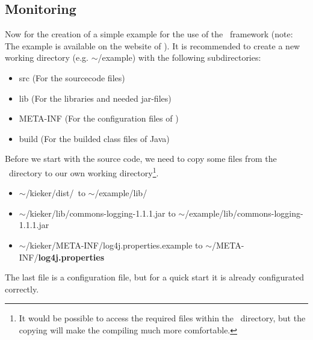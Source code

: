 \documentclass[a4paper, oneside, 11pt]{scrartcl}
\begin{document}
    \subsection{Monitoring}
      Now for the creation of a simple example for the use of the \Kieker\ framework (note: The example is available on the website of \Kieker). It is recommended to create a new working directory (e.g. $\sim$/example) with the following subdirectories:
      \begin{itemize}
	\item src (For the sourcecode files)
	\item lib (For the libraries and needed jar-files)
	\item META-INF (For the configuration files of \Kieker)
	\item build (For the builded class files of Java)
      \end{itemize}
      Before we start with the source code, we need to copy some files from the \Kieker\ directory to our own working directory\footnote{It would be possible to access the required files within the \Kieker\ directory, but the copying will make the compiling much more comfortable.}.
      \begin{itemize}
	\item $\sim$/kieker/dist/\monitoringCtrlJar\ to $\sim$/example/lib/\monitoringCtrlJar
	\item $\sim$/kieker/lib/commons-logging-1.1.1.jar to $\sim$/example/lib/commons-logging-1.1.1.jar
	\item $\sim$/kieker/META-INF/log4j.properties.example to $\sim$/META-INF/\textbf{log4j.properties}
      \end{itemize}
      The last file is a configuration file, but for a quick start it is already configurated correctly.\\
\end{document}
